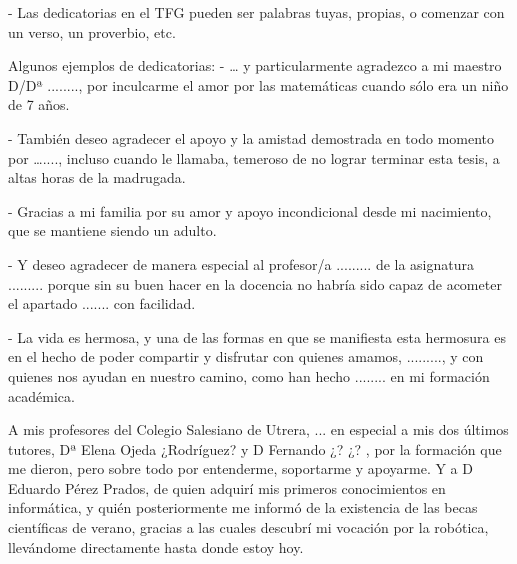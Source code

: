 - Las dedicatorias en el TFG pueden ser palabras tuyas, propias, o comenzar con un verso, un proverbio, etc.

Algunos ejemplos de dedicatorias:
- … y particularmente agradezco a mi maestro D/Dª ........, por inculcarme el amor por las matemáticas cuando sólo era un niño de 7 años.

- También deseo agradecer el apoyo y la amistad demostrada en todo momento por …...., incluso cuando le llamaba, temeroso de no lograr terminar esta tesis, a altas horas de la madrugada.

- Gracias a mi familia por su amor y apoyo incondicional desde mi nacimiento, que se mantiene siendo un adulto.

- Y deseo agradecer de manera especial al profesor/a ......... de la asignatura ......... porque sin su buen hacer en la docencia no habría sido capaz de acometer el apartado ....... con facilidad.

- La vida es hermosa, y una de las formas en que se manifiesta esta hermosura es en el hecho de poder compartir y disfrutar con quienes amamos, ........., y con quienes nos ayudan en nuestro camino, como han hecho ........ en mi formación académica.



A mis profesores del Colegio Salesiano de Utrera, ...
en especial a mis dos últimos tutores, Dª Elena Ojeda ¿Rodríguez? y D Fernando ¿? ¿? , por la formación que me dieron, pero sobre todo por entenderme, soportarme y apoyarme. Y a D Eduardo Pérez Prados, de quien adquirí mis primeros conocimientos en informática, y quién posteriormente me informó de la existencia de las becas científicas de verano, gracias a las cuales descubrí mi vocación por la robótica, llevándome directamente hasta donde estoy hoy.

{}%
\vspace{-.3cm}
{}%
{}%